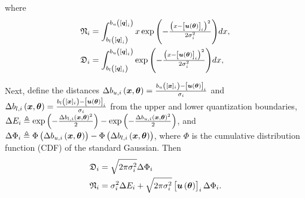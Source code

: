 where 
\begin{align*}
    \mathfrak{N}_i&=\int_{b_l\left(\left[{\bm{q}}\right]_i\right)}^{b_u\left(\left[{\bm{q}}\right]_i\right)} x\exp{\left(-\tfrac{\left(x-\left[{\bm{u}\left(\bm{\theta}\right)}\right]_i\right)^2}{2\sigma^2_i}\right)}dx,\\
    \mathfrak{D}_i&=\int_{b_l\left(\left[{\bm{q}}\right]_i\right)}^{b_u\left(\left[{\bm{q}}\right]_i\right)} \exp{\left(-\tfrac{\left(x-\left[{\bm{u}\left(\bm{\theta}\right)}\right]_i\right)^2}{2\sigma^2_i}\right)}dx,
\end{align*}

Next, {define the distances 
$\Delta b_{u,i}\left(\bm{x},\bm{\theta}\right)=\frac{b_u\left([\bm{x}]_i\right)-\left[{\bm{u}\left(\bm{\theta}\right)}\right]_i}{\sigma_i}$ and $\Delta b_{l,i}\left(\bm{x},\bm{\theta}\right)=\frac{b_l\left([\bm{x}]_i\right)-\left[{\bm{u}\left(\bm{\theta}\right)}\right]_i}{\sigma_i}$ from the upper and lower quantization boundaries, $\Delta E_i\triangleq  \exp\left(-\frac{\Delta b_{l,i}\left(\bm{x},\bm{\theta}\right)^2}{2}\right)-\exp\left(-\frac{\Delta b_{u,i}\left(\bm{x},\bm{\theta}\right)^2}{2}\right)$, and $\Delta\Phi_i\triangleq\Phi\left(\Delta b_{u,i}\left(\bm{x},\bm{\theta}\right) \right)-\Phi\left(\Delta b_{l,i}\left(\bm{x},\bm{\theta}\right)\right)$, where
$\Phi$ is the cumulative distribution function (CDF) of the standard Gaussian. 
Then
}
\begin{align} \label{eq:score_quant_dem} 
    \mathfrak{D}_i&=\sqrt{2\pi\sigma_i^2}\Delta\Phi_i \\
    \mathfrak{N}_i&=
     \sigma_i^2\Delta E_i+\sqrt{2\pi\sigma^2_i}\left[{\bm{u}\left(\bm{\theta}\right)}\right]_i\Delta\Phi_i.\label{eq:score_quant_num}
\end{align}

